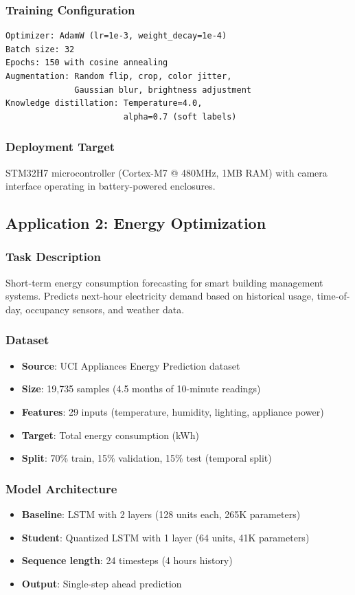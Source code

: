 \subsubsection{Training Configuration}
\begin{verbatim}
Optimizer: AdamW (lr=1e-3, weight_decay=1e-4)
Batch size: 32
Epochs: 150 with cosine annealing
Augmentation: Random flip, crop, color jitter,
              Gaussian blur, brightness adjustment
Knowledge distillation: Temperature=4.0,
                        alpha=0.7 (soft labels)
\end{verbatim}

\subsubsection{Deployment Target}
STM32H7 microcontroller (Cortex-M7 @ 480MHz, 1MB RAM) with camera interface operating in battery-powered enclosures.

\subsection{Application 2: Energy Optimization}

\subsubsection{Task Description}
Short-term energy consumption forecasting for smart building management systems. Predicts next-hour electricity demand based on historical usage, time-of-day, occupancy sensors, and weather data.

\subsubsection{Dataset}
\begin{itemize}
\item \textbf{Source}: UCI Appliances Energy Prediction dataset
\item \textbf{Size}: 19,735 samples (4.5 months of 10-minute readings)
\item \textbf{Features}: 29 inputs (temperature, humidity, lighting, appliance power)
\item \textbf{Target}: Total energy consumption (kWh)
\item \textbf{Split}: 70\% train, 15\% validation, 15\% test (temporal split)
\end{itemize}

\subsubsection{Model Architecture}
\begin{itemize}
\item \textbf{Baseline}: LSTM with 2 layers (128 units each, 265K parameters)
\item \textbf{Student}: Quantized LSTM with 1 layer (64 units, 41K parameters)
\item \textbf{Sequence length}: 24 timesteps (4 hours history)
\item \textbf{Output}: Single-step ahead prediction
\end{itemize}

